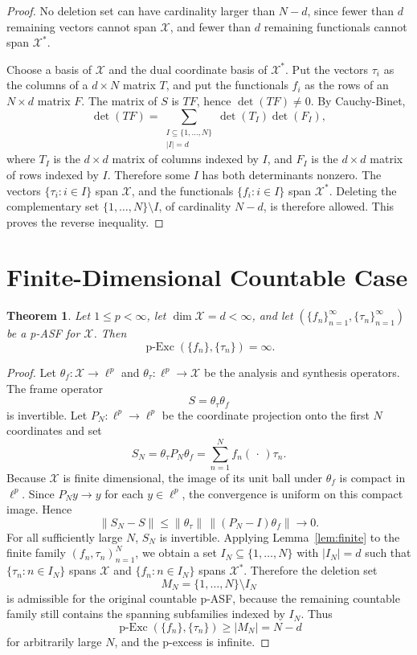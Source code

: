 \documentclass[11pt]{article}
\newtheorem{theorem}{Theorem}
\newcommand{\X}{\mathcal{X}}
\newcommand{\Exc}{\operatorname{p\text{-}Exc}}
\begin{document}
\begin{proof}
No deletion set can have cardinality larger than \(N-d\), since fewer than
\(d\) remaining vectors cannot span \(\X\), and fewer than \(d\) remaining
functionals cannot span \(\X^*\).

Choose a basis of \(\X\) and the dual coordinate basis of \(\X^*\).  Put the
vectors \(\tau_i\) as the columns of a \(d\times N\) matrix \(T\), and put
the functionals \(f_i\) as the rows of an \(N\times d\) matrix \(F\).  The
matrix of \(S\) is \(TF\), hence \(\det(TF)\ne0\).  By Cauchy-Binet,
\[
  \det(TF)
  =
  \sum_{\substack{I\subseteq\{1,\ldots,N\}\\ |I|=d}}
     \det(T_I)\det(F_I),
\]
where \(T_I\) is the \(d\times d\) matrix of columns indexed by \(I\), and
\(F_I\) is the \(d\times d\) matrix of rows indexed by \(I\).  Therefore
some \(I\) has both determinants nonzero.  The vectors
\(\{\tau_i:i\in I\}\) span \(\X\), and the functionals
\(\{f_i:i\in I\}\) span \(\X^*\).  Deleting the complementary set
\(\{1,\ldots,N\}\setminus I\), of cardinality \(N-d\), is therefore allowed.
This proves the reverse inequality.
\end{proof}

\section*{Finite-Dimensional Countable Case}

\begin{theorem}\label{thm:finite-dim}
Let \(1\le p<\infty\), let \(\dim \X=d<\infty\), and let
\((\{f_n\}_{n=1}^\infty,\{\tau_n\}_{n=1}^\infty)\) be a p-ASF for \(\X\).
Then
\[
  \Exc(\{f_n\},\{\tau_n\})=\infty .
\]
\end{theorem}

\begin{proof}
Let \(\theta_f:\X\to\ell^p\) and \(\theta_\tau:\ell^p\to\X\) be the
analysis and synthesis operators.  The frame operator
\[
  S=\theta_\tau\theta_f
\]
is invertible.  Let \(P_N:\ell^p\to\ell^p\) be the coordinate projection
onto the first \(N\) coordinates and set
\[
  S_N=\theta_\tau P_N\theta_f
      =\sum_{n=1}^N f_n(\,\cdot\,)\tau_n .
\]
Because \(\X\) is finite dimensional, the image of its unit ball under
\(\theta_f\) is compact in \(\ell^p\).  Since \(P_Ny\to y\) for each
\(y\in\ell^p\), the convergence is uniform on this compact image.  Hence
\[
  \|S_N-S\|
  \le \|\theta_\tau\|\,\|(P_N-I)\theta_f\|
  \longrightarrow 0 .
\]
For all sufficiently large \(N\), \(S_N\) is invertible.  Applying
Lemma~\ref{lem:finite} to the finite family
\((f_n,\tau_n)_{n=1}^N\), we obtain a set \(I_N\subseteq\{1,\ldots,N\}\)
with \(|I_N|=d\) such that \(\{\tau_n:n\in I_N\}\) spans \(\X\) and
\(\{f_n:n\in I_N\}\) spans \(\X^*\).  Therefore the deletion set
\[
  M_N=\{1,\ldots,N\}\setminus I_N
\]
is admissible for the original countable p-ASF, because the remaining
countable family still contains the spanning subfamilies indexed by \(I_N\).
Thus
\[
  \Exc(\{f_n\},\{\tau_n\})\ge |M_N|=N-d
\]
for arbitrarily large \(N\), and the p-excess is infinite.
\end{proof}
\end{document}
